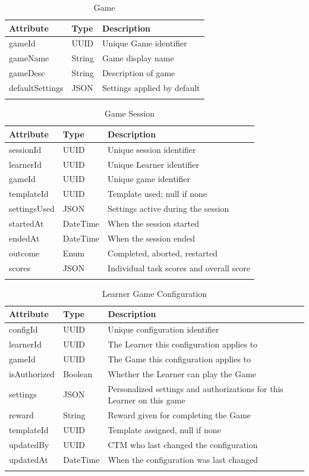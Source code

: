\documentclass[12pt]{article}
\begin{document}
\begin{longtable}{p{} p{} p{}}
\toprule
Attribute & Type & Description\\
\midrule
gameId & UUID & Unique Game identifier\\
gameName & String & Game display name\\
gameDesc & String & Description of game\\
defaultSettings & JSON & Settings applied by default\\

\bottomrule
\caption{Game} \label{tab:Game}
\end{longtable}

\begin{longtable}{p{} p{} p{}}
\toprule
Attribute & Type & Description\\
\midrule
sessionId & UUID & Unique session identifier\\
learnerId & UUID & Unique Learner identifier\\
gameId & UUID & Unique game identifier\\
templateId & UUID & Template used; null if none\\
settingsUsed & JSON & Settings active during the session\\
startedAt & DateTime & When the session started\\
endedAt & DateTime & When the session ended\\
outcome & Enum & Completed, aborted, restarted\\
scores & JSON & Individual task scores and overall score\\
\bottomrule
\caption{Game Session} \label{tab:GameSession}
\end{longtable}

\begin{longtable}{p{} p{} p{}}
\toprule
Attribute & Type & Description\\
\midrule
configId & UUID & Unique configuration identifier\\
learnerId & UUID & The Learner this configuration applies to\\
gameId & UUID & The Game this configuration applies to\\
isAuthorized & Boolean & Whether the Learner can play the Game\\
settings & JSON & Personalized settings and authorizations for this Learner on this game\\
reward & String & Reward given for completing the Game\\
templateId & UUID & Template assigned, null if none\\
updatedBy & UUID & CTM who last changed the configuration\\
updatedAt & DateTime & When the configuration was last changed\\
\bottomrule
\caption{Learner Game Configuration} \label{tab:LearnerGameConfig}
\end{longtable}
\end{document}
